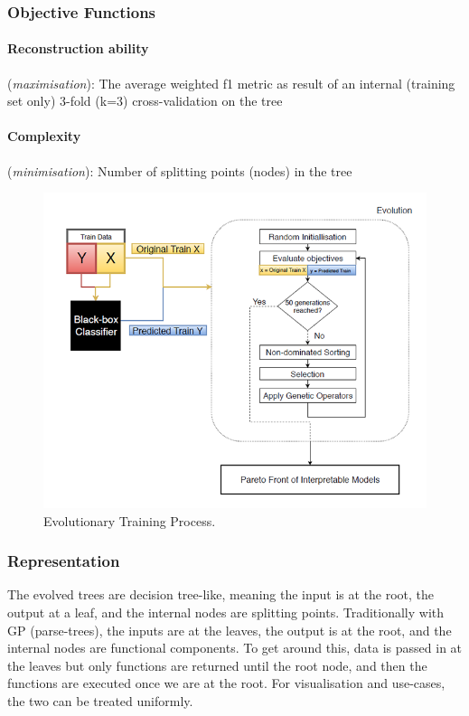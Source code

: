 \subsubsection{Objective Functions}
\paragraph{\textbf{Reconstruction ability}} (\textit{maximisation}): The average weighted f1 metric as result of an internal (training set only) 3-fold (k=3) cross-validation on the tree

\paragraph{\textbf{Complexity}} (\textit{minimisation}): Number of splitting points (nodes) in the tree


\begin{figure}
\includegraphics[width=\columnwidth]{evolution_process}
\caption{Evolutionary Training Process.}
\label{fig:evolution}
\end{figure}

\subsubsection{Representation}
The evolved trees are decision tree-like, meaning the input is at the root, the output at a leaf, and the internal nodes are splitting points. Traditionally with GP (parse-trees), the inputs are at the leaves, the output is at the root, and the internal nodes are functional components. To get around this, data is passed in at the leaves but only functions are returned until the root node, and then the functions are executed once we are at the root. For visualisation and use-cases, the two can be treated uniformly. 

